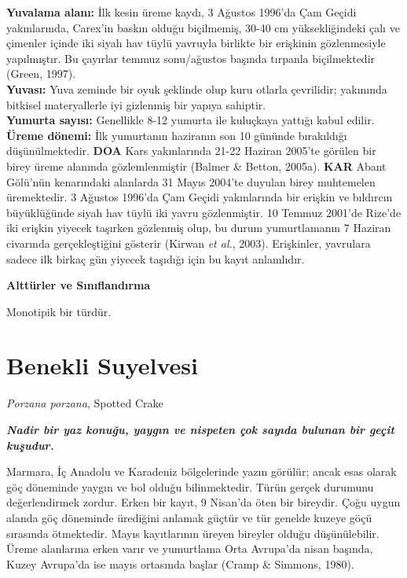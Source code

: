 \documentclass[
  a4paper,
  DIV=11,
  numbers=noendperiod]{scrreprt}
\begin{document}
\textbf{Yuvalama alanı:} İlk kesin üreme kaydı, 3 Ağustos 1996'da Çam
Geçidi yakınlarında, Carex'in baskın olduğu biçilmemiş, 30-40 cm
yüksekliğindeki çalı ve çimenler içinde iki siyah hav tüylü yavruyla
birlikte bir erişkinin gözlenmesiyle yapılmıştır. Bu çayırlar temmuz
sonu/ağustos başında tırpanla biçilmektedir (Green, 1997).\\
\textbf{Yuvası:} Yuva zeminde bir oyuk şeklinde olup kuru otlarla
çevrilidir; yakınında bitkisel materyallerle iyi gizlenmiş bir yapıya
sahiptir.\\
\textbf{Yumurta sayısı:} Genellikle 8-12 yumurta ile kuluçkaya yattığı
kabul edilir.\\
\textbf{Üreme dönemi:} İlk yumurtanın haziranın son 10 gününde
bırakıldığı düşünülmektedir. \textbf{DOA} Kars yakınlarında 21-22
Haziran 2005'te görülen bir birey üreme alanında gözlemlenmiştir (Balmer
\& Betton, 2005a). \textbf{KAR} Abant Gölü'nün kenarındaki alanlarda 31
Mayıs 2004'te duyulan birey muhtemelen üremektedir. 3 Ağustos 1996'da
Çam Geçidi yakınlarında bir erişkin ve bıldırcın büyüklüğünde siyah hav
tüylü iki yavru gözlenmiştir. 10 Temmuz 2001'de Rize'de iki erişkin
yiyecek taşırken gözlenmiş olup, bu durum yumurtlamanın 7 Haziran
civarında gerçekleştiğini gösterir (Kirwan \emph{et al.}, 2003).
Erişkinler, yavrulara sadece ilk birkaç gün yiyecek taşıdığı için bu
kayıt anlamlıdır.

\textbf{Alttürler ve Sınıflandırma}

Monotipik bir türdür.

\section{Benekli Suyelvesi}\label{benekli-suyelvesi}

\emph{Porzana porzana}, Spotted Crake

\textbf{\emph{Nadir bir yaz konuğu, yaygın ve nispeten çok sayıda
bulunan bir geçit kuşudur.}}

Marmara, İç Anadolu ve Karadeniz bölgelerinde yazın görülür; ancak esas
olarak göç döneminde yaygın ve bol olduğu bilinmektedir. Türün gerçek
durumunu değerlendirmek zordur. Erken bir kayıt, 9 Nisan'da öten bir
bireydir. Çoğu uygun alanda göç döneminde ürediğini anlamak güçtür ve
tür genelde kuzeye göçü sırasında ötmektedir. Mayıs kayıtlarının üreyen
bireyler olduğu düşünülebilir. Üreme alanlarına erken varır ve
yumurtlama Orta Avrupa'da nisan başında, Kuzey Avrupa'da ise mayıs
ortasında başlar (Cramp \& Simmons, 1980).
\end{document}
